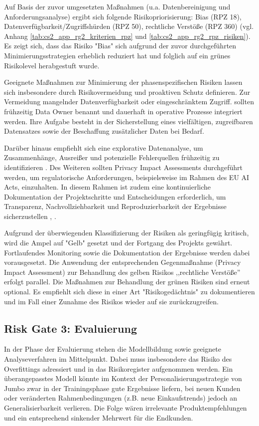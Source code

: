 Auf Basis der zuvor umgesetzten Maßnahmen (u.a. Datenbereinigung und Anforderungsanalyse)
ergibt sich folgende Risikopriorisierung: Bias (RPZ 18), Datenverfügbarkeit/Zugriffshürden (RPZ 50),
rechtliche Verstöße (RPZ 360) (vgl. Anhang \ref{tab:cs2_app_rg2_kriterien_rpz} und \ref{tab:cs2_app_rg2_rpz_risiken}).
Es zeigt sich, dass das Risiko "Bias" sich aufgrund der zuvor durchgeführten Minimierungsstrategien erheblich reduziert hat und folglich auf ein grünes Risikolevel herabgestuft wurde.

Geeignete Maßnahmen zur Minimierung der phasenspezifischen Risiken lassen sich insbesondere 
durch Risikovermeidung und proaktiven Schutz definieren. 
Zur Vermeidung mangelnder Datenverfügbarkeit oder eingeschränktem Zugriff. 
sollten frühzeitig Data Owner benannt und dauerhaft in operative Prozesse integriert werden. 
Ihre Aufgabe besteht in der Sicherstellung eines vielfältigen, zugreifbaren Datensatzes 
sowie der Beschaffung zusätzlicher Daten bei Bedarf.

Darüber hinaus empfiehlt sich eine explorative Datenanalyse, 
um Zusammenhänge, Ausreißer und potenzielle Fehlerquellen frühzeitig zu identifizieren \cite{schulz_dasc-pm_2022}. 
Des Weiteren sollten Privacy Impact Assessments durchgeführt werden, 
um regulatorische Anforderungen, beispielsweise im Rahmen des EU AI Acts, einzuhalten. 
In diesem Rahmen ist zudem eine kontinuierliche Dokumentation der Projektschritte und Entscheidungen erforderlich, 
um Transparenz, Nachvollziehbarkeit und Reproduzierbarkeit der Ergebnisse sicherzustellen 
\cite{EUAIAct2024}, \cite{schulz_dasc-pm_2022}.

Aufgrund der überwiegenden Klassifizierung der Risiken als geringfügig kritisch, wird die Ampel auf "Gelb" gesetzt
und der Fortgang des Projekts gewährt. Fortlaufendes Monitoring sowie die 
Dokumentation der Ergebnisse werden dabei vorausgesetzt. Die Anwendung der entsprechenden Gegenmaßnahme (Privacy Impact Assessment) zur Behandlung des gelben Risikos ,,rechtliche Verstöße'' erfolgt parallel. Die Maßnahmen zur Behandlung der grünen Risiken sind erneut optional. Es empfiehlt sich diese in einer Art "Risikogedächtnis" zu dokumentieren und im Fall einer Zunahme des Risikos wieder auf sie zurückzugreifen.

\subsection{Risk Gate 3: Evaluierung}
In der Phase der Evaluierung stehen die Modellbildung sowie geeignete Analyseverfahren im Mittelpunkt. 
Dabei muss insbesondere das Risiko des Overfittings adressiert und in das Risikoregister aufgenommen werden. 
Ein überangepasstes Modell könnte im Kontext der Personalisierungsstrategie von Jumbo zwar in der Trainingsphase gute Ergebnisse liefern, 
bei neuen Kunden oder veränderten Rahmenbedingungen (z.B. neue Einkaufstrends) jedoch an Generalisierbarkeit verlieren. 
Die Folge wären irrelevante Produktempfehlungen und ein entsprechend sinkender Mehrwert für die Endkunden.

